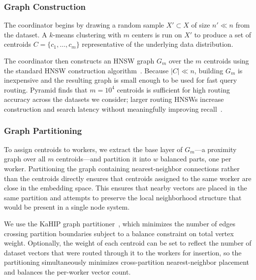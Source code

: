 \documentclass[sigconf,review,anonymous]{acmart}
\begin{document}
\subsubsection{Graph Construction}
    The coordinator begins by drawing a random sample $X' \subset X$ of size $n' \ll n$ from the dataset. A $k$-means clustering with $m$ centers is run on $X'$ to produce a set of centroids $C = \{c_1, \ldots, c_m\}$ representative of the underlying data distribution. 

    The coordinator then constructs an HNSW graph $G_m$ over the $m$ centroids using the standard HNSW construction algorithm~\cite{malkov2018efficient}. Because $|C| \ll n$, building $G_m$ is inexpensive and the resulting graph is small enough to be used for fast query routing. Pyramid finds that $m = 10^4$ centroids is sufficient for high routing accuracy across the datasets we consider; larger routing HNSWs increase construction and search latency without meaningfully improving recall~\cite{deng2019pyramid}.

\subsubsection{Graph Partitioning}
    \label{sec:partitioning}
    To assign centroids to workers, we extract the base layer of $G_m$---a proximity graph over all $m$ centroids---and partition it into $w$ balanced parts, one per worker. Partitioning the graph containing nearest-neighbor connections rather than the centroids directly ensures that centroids assigned to the same worker are close in the embedding space. This ensures that nearby vectors are placed in the same partition and attempts to preserve the local neighborhood structure that would be present in a single node system.
    
    We use the KaHIP graph partitioner~\cite{sandersschulz2013kahip}, which minimizes the number of edges crossing partition boundaries subject to a balance constraint on total vertex weight. Optionally, the weight of each centroid can be set to reflect the number of dataset vectors that were routed through it to the workers for insertion, so the partitioning simultaneously minimizes cross-partition nearest-neighbor placement and balances the per-worker vector count. 
    
\end{document}
